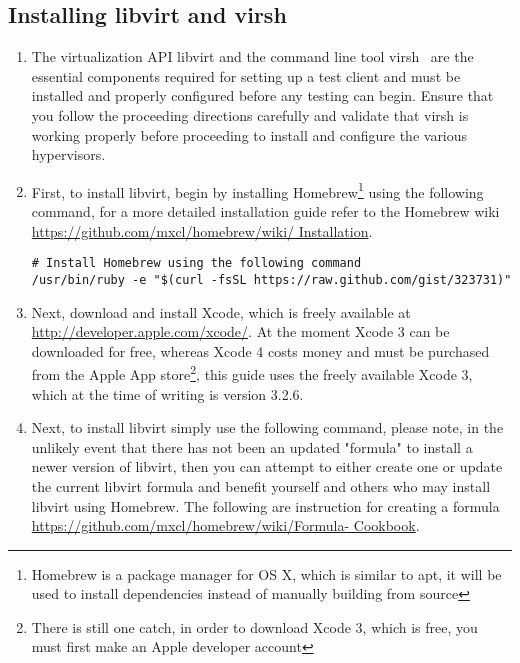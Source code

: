\subsection{Installing libvirt and virsh}
\label{sec:osxvirsh}
\begin{enumerate}
\item	The virtualization API libvirt and the command line tool virsh~\cite{libvirt} are the essential components required 
		for setting up a test client and must be installed and properly configured before any testing can begin. Ensure that
		you follow the proceeding directions carefully and validate that virsh is working properly before proceeding to 
		install and configure the various hypervisors.

\item	First, to install libvirt, begin by installing Homebrew\footnote{Homebrew is a package manager for OS X, which is similar to apt, it will
                be used to install dependencies instead of manually building from source} using the following command, for a more detailed
                installation guide refer to the Homebrew wiki  \url{https://github.com/mxcl/homebrew/wiki/ Installation}.

\lstset{language=bash caption=Install Homebrew}
\begin{lstlisting}
# Install Homebrew using the following command
/usr/bin/ruby -e "$(curl -fsSL https://raw.github.com/gist/323731)"
\end{lstlisting}

\item        Next, download and install Xcode, which is freely available at \url{http://developer.apple.com/xcode/}. At the moment Xcode 3 can
                be downloaded for free, whereas Xcode 4 costs money and must be purchased from the Apple App store\footnote{There is still one
                catch, in order to download Xcode 3, which is free, you must first make an Apple developer account}, this guide uses the freely
                available Xcode 3, which at the time of writing is version 3.2.6.

\item        Next, to install libvirt simply use the following command, please note, in the unlikely event that there has not been an updated
                "formula" to install a newer version of libvirt, then you can attempt to either create one or update the current libvirt formula and 
                benefit yourself and others who may install libvirt using Homebrew.  The following are instruction for creating a formula 
                \url{https://github.com/mxcl/homebrew/wiki/Formula- Cookbook}.
                

\end{enumerate}

